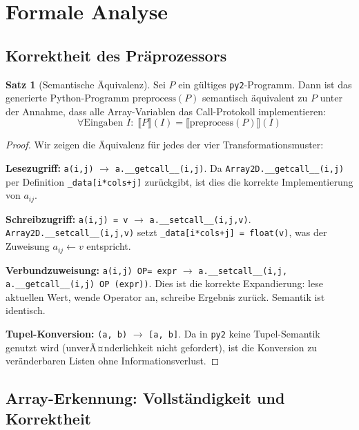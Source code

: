 ﻿\documentclass[a4paper,12pt]{article}
\theoremstyle{definition}
\newtheorem{satz}{Satz}
\begin{document}
\section{Formale Analyse}

\subsection{Korrektheit des Pr\"aprozessors}

\begin{satz}[Semantische \"Aquivalenz]
	Sei $P$ ein g\"ultiges \texttt{py2}-Programm. Dann ist das generierte Python-Programm
	$\text{preprocess}(P)$ semantisch \"aquivalent zu $P$ unter der Annahme, dass alle
	Array-Variablen das Call-Protokoll implementieren:
	\[
		\forall \text{Eingaben } I: \;\llbracket P \rrbracket(I) = \llbracket \text{preprocess}(P) \rrbracket(I)
	\]
\end{satz}

\begin{proof}
	Wir zeigen die \"Aquivalenz f\"ur jedes der vier Transformationsmuster:

	\textbf{Lesezugriff:} \texttt{a(i,j)} $\to$ \texttt{a.\_\_getcall\_\_(i,j)}.
	Da \texttt{Array2D.\_\_getcall\_\_(i,j)} per Definition \texttt{\_data[i*cols+j]}
	zur\"uckgibt, ist dies die korrekte Implementierung von $a_{ij}$.

	\textbf{Schreibzugriff:} \texttt{a(i,j) = v} $\to$ \texttt{a.\_\_setcall\_\_(i,j,v)}.
	\texttt{Array2D.\_\_setcall\_\_(i,j,v)} setzt \texttt{\_data[i*cols+j] = float(v)},
	was der Zuweisung $a_{ij} \leftarrow v$ entspricht.

	\textbf{Verbundzuweisung:} \texttt{a(i,j) OP= expr} $\to$
	\texttt{a.\_\_setcall\_\_(i,j, a.\_\_getcall\_\_(i,j) OP (expr))}.
	Dies ist die korrekte Expandierung: lese aktuellen Wert, wende Operator an,
	schreibe Ergebnis zur\"uck. Semantik ist identisch.

	\textbf{Tupel-Konversion:} \texttt{(a, b)} $\to$ \texttt{[a, b]}.
	Da in \texttt{py2} keine Tupel-Semantik genutzt wird (unverÃ¤nderlichkeit nicht
	gefordert), ist die Konversion zu ver\"anderbaren Listen ohne Informationsverlust.
\end{proof}

\subsection{Array-Erkennung: Vollst\"andigkeit und Korrektheit}
\end{document}
